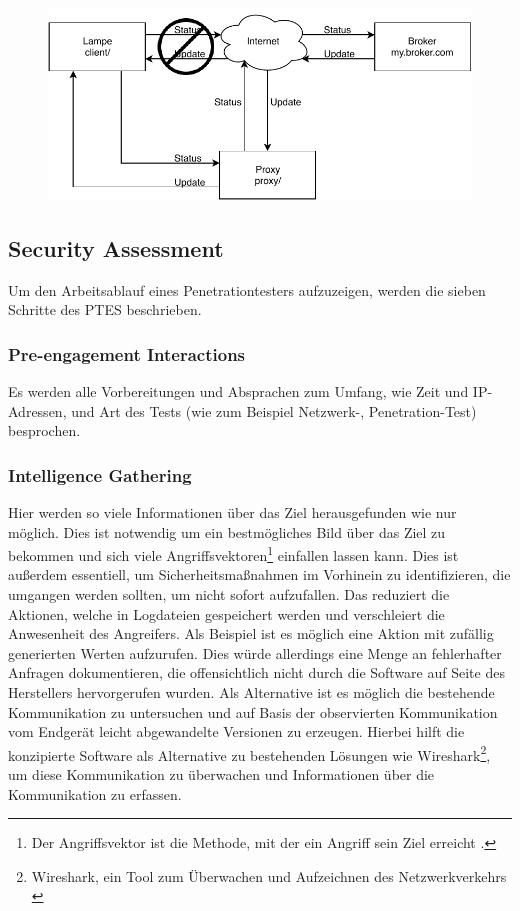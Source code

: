         \begin{figure}[h]%
            \centering
            \includegraphics[width=14cm]{tex/bilder/2_grundlagen/Szenario1_MitM.pdf}
            \label{fig:szenario-mitm}
        \end{figure}
        
    \subsection{Security Assessment}
        Um den Arbeitsablauf eines Penetrationtesters aufzuzeigen, werden die sieben Schritte des \ac{PTES} \cite{hsiangchih_2019} beschrieben.
    
    \subsubsection{\glqq Pre-engagement Interactions\grqq{}}
        Es werden alle Vorbereitungen und Absprachen zum Umfang, wie Zeit und \acs{IP}-Adressen, und Art des Tests (wie zum Beispiel Netzwerk-, Penetration-Test) besprochen.
    \subsubsection{\glqq Intelligence Gathering\grqq{}}
        Hier werden so viele Informationen über das Ziel herausgefunden wie nur möglich. Dies ist notwendig um ein bestmögliches Bild über das Ziel zu bekommen und sich viele Angriffsvektoren\footnote{Der Angriffsvektor ist die Methode, mit der ein Angriff sein Ziel erreicht \cite{HANSMAN200531}.} einfallen lassen kann. Dies ist außerdem essentiell, um Sicherheitsmaßnahmen im Vorhinein zu identifizieren, die umgangen werden sollten, um nicht sofort aufzufallen. Das reduziert die Aktionen, welche in Logdateien gespeichert werden und verschleiert die Anwesenheit des Angreifers. Als Beispiel ist es möglich eine Aktion mit zufällig generierten Werten aufzurufen. Dies würde allerdings eine Menge an fehlerhafter Anfragen dokumentieren, die offensichtlich nicht durch die Software auf Seite des Herstellers hervorgerufen wurden. Als Alternative ist es möglich die bestehende Kommunikation zu untersuchen und auf Basis der observierten Kommunikation vom Endgerät leicht abgewandelte Versionen zu erzeugen. Hierbei hilft die konzipierte Software als Alternative zu bestehenden Lösungen wie Wireshark\footnote{Wireshark, ein Tool zum Überwachen und Aufzeichnen des Netzwerkverkehrs \cite{SandersChris2017Ppa}}, um diese Kommunikation zu überwachen und Informationen über die Kommunikation zu erfassen.
